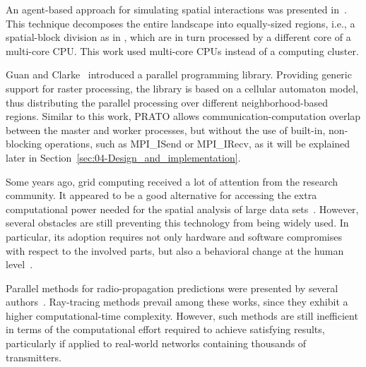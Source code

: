 An agent-based approach for simulating spatial interactions was presented
in~\cite{Gong_Parallel_agent_based_simulation_of_individual_level_spatial_interactions_within_a_multicore_computing_environment:2012}.
This technique decomposes the entire landscape into equally-sized
regions, i.e., a spatial-block division as in \cite{Tabik-High_performance_three_horizon_composition_algorithm_for_large_scale_terrains:2011},
which are in turn processed by a different core of a multi-core CPU.
This work used multi-core CPUs instead of a computing cluster.

Guan and Clarke~\cite{Guan-A_general_purpose_parallel_raster_processing_library:2010}
introduced a parallel programming library. Providing generic support
for raster processing, the library is based on a cellular automaton
model, thus distributing the parallel processing over different neighborhood-based
regions. Similar to this work, PRATO allows communication-computation
overlap between the master and worker processes, but without the use
of built-in, non-blocking operations, such as MPI\_ISend or MPI\_IRecv,
as it will be explained later in Section~\ref{sec:04-Design_and_implementation}.

Some years ago, grid computing received a lot of attention from the
research community. It appeared to be a good alternative for accessing
the extra computational power needed for the spatial analysis of large
data sets~\cite{Armstrong_Using_a_computational_grid_for_geographic_information_analysis:2005,Vouk_Cloud_computing_issues_research_and_implementations:2008,Wang_A_cybergis_framework_for_the_synthesis_of_cyberinfrastructure_GIS_and_spatial_analysis:2010}.
However, several obstacles are still preventing this technology from
being widely used. In particular, its adoption requires not only hardware
and software compromises with respect to the involved parts, but also
a behavioral change at the human level~\cite{Armstrong_Using_a_computational_grid_for_geographic_information_analysis:2005}.

Parallel methods for radio-propagation predictions were presented
by several authors~\cite{Athanaileas-Parallel_radio_wave_propagation_modeling:2010,Liu-Modeling_and_simulation_of_electromagnetic_environment:2012,Schroder-Efficient_implementation_of_parallel_radio_wave_propagation:2011}.
Ray-tracing methods prevail among these works, since they exhibit
a higher computational-time complexity. However, such methods are
still inefficient in terms of the computational effort required to
achieve satisfying results, particularly if applied to real-world
networks containing thousands of transmitters.


